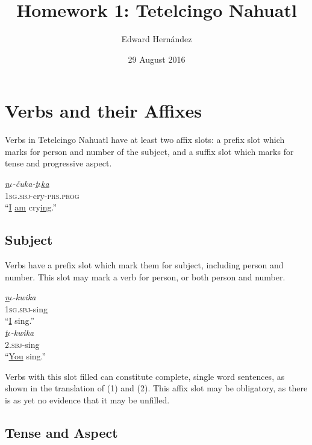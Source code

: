 \documentclass[doc,12pt]{apa6}
\begin{document}
\title{Homework 1: Tetelcingo Nahuatl}
\author{Edward Hern\'{a}ndez}
\date{29 August 2016}
\maketitle

\setcounter{secnumdepth}{3}

\section{Verbs and their Affixes}

Verbs in Tetelcingo Nahuatl have at least two affix slots: a prefix slot which
marks for person and number of the subject, and a suffix slot which marks for
tense and progressive aspect.

\begin{exe}
	\ex \textit{\underline{n$\iota$}-\v{c}uka-\underline{t$\iota$ka}} \\
	\textsc{1sg.sbj}-cry-\textsc{prs.prog} \\
	``\underline{I} \underline{am} cry\underline{ing}.''
\end{exe}

\subsection{Subject}

Verbs have a prefix slot which mark them for subject, including person and
number. This slot may mark a verb for person, or both person and
number.

\begin{exe}
	\ex \textit{\underline{n$\iota$}-kwika} \\
		\textsc{1sg.sbj}-sing \\
		``\underline{I} sing.'' \\
	\ex \textit{\underline{t$\iota$}-kwika} \\
		\textsc{2.sbj}-sing \\
		``\underline{You} sing.''
\end{exe}

Verbs with this slot filled can constitute complete, single word sentences, as
shown in the translation of (1) and (2). This affix slot may be obligatory, as
there is as yet no evidence that it may be unfilled.

\subsection{Tense and Aspect}
\end{document}
